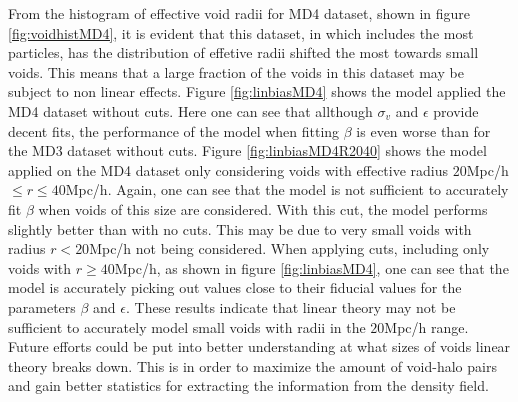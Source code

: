 From the histogram of effective void radii for MD4 dataset, shown in figure \ref{fig:voidhistMD4}, it is evident that this dataset, in which includes the most particles, has the distribution of effetive radii shifted the most towards small voids. This means that a large fraction of the voids in this dataset may be subject to non linear effects. Figure \ref{fig:linbiasMD4} shows the model applied the MD4 dataset without cuts. Here one can see that allthough $\sigma_v$ and $\epsilon$ provide decent fits, the performance of the model when fitting $\beta$ is even worse than for the MD3 dataset without cuts. Figure \ref{fig:linbiasMD4R2040} shows the model applied on the MD4 dataset only considering voids with effective radius $20$Mpc/h$\leq r\leq 40$Mpc/h. Again, one can see that the model is not sufficient to accurately fit $\beta$ when voids of this size are considered. With this cut, the model performs slightly better than with no cuts. This may be due to very small voids with radius $r< 20$Mpc/h not being considered. When applying cuts, including only voids with $r\geq 40$Mpc/h, as shown in figure \ref{fig:linbiasMD4}, one can see that the model is accurately picking out values close to their fiducial values for the parameters $\beta$ and $\epsilon$. These results indicate that linear theory may not be sufficient to accurately model small voids with radii in the $20$Mpc/h range. Future efforts could be put into better understanding at what sizes of voids linear theory breaks down. This is in order to maximize the amount of void-halo pairs and gain better statistics for extracting the information from the density field.

